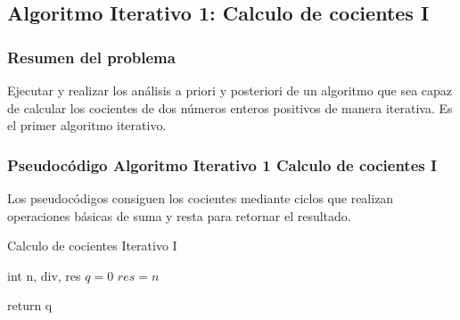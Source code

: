     \subsection{Algoritmo Iterativo 1: Calculo de cocientes I}
    \subsubsection{Resumen del problema}
        Ejecutar y realizar los análisis a priori y posteriori de un algoritmo que sea capaz de calcular los cocientes de dos números enteros positivos de manera iterativa. Es el primer algoritmo iterativo.
        
    \subsubsection{Pseudocódigo Algoritmo Iterativo 1 Calculo de cocientes I}
        Los pseudocódigos consiguen los cocientes mediante ciclos que realizan operaciones básicas de suma y resta para retornar el resultado. 
        \begin{algorithm}
            \caption{Calculo de cocientes Iterativo I 
            }\label{alg:two}
            int n, div, res \;
            $q = 0$\;
            $res = n$\;
                
            return q\;
           
        \end{algorithm}

